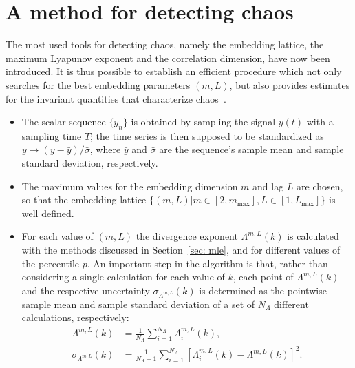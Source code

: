 \section{A method for detecting chaos}\label{sec: method for chaos}

The most used tools for detecting chaos, namely the embedding lattice, the maximum Lyapunov exponent
and the correlation dimension, have now been introduced.
It is thus possible to establish an efficient procedure which not only searches for the best
embedding parameters $(m,L)$, but also provides estimates for the invariant quantities that
characterize chaos~\cite{ref:perinelli2020chasing}.

\begin{itemize}

\item
The scalar sequence $\{y_n\}$ is obtained by sampling the signal $y(t)$ with a sampling time $T$;
the time series is then supposed to be standardized as
$y \rightarrow (y - \bar{y})/\bar{\sigma}$, where $\bar{y}$ and $\bar{\sigma}$ are the sequence's
sample mean and sample standard deviation, respectively.


\item
The maximum values for the embedding dimension $m$ and lag $L$ are chosen, so that the embedding
lattice $\{(m,L)|m\in[2,m_{\max}],L\in[1,L_{\max}]\}$ is well defined.


\item
For each value of $(m,L)$ the divergence exponent $\Lambda^{m,L}(k)$ is calculated with the methods
discussed in Section~\ref{sec: mle}, and for different values of the percentile $p$.
An important step in the algorithm is that, rather than
considering a single calculation for each value of $k$, each point of $\Lambda^{m,L}(k)$
and the respective uncertainty $\sigma_{\Lambda^{m,L}}(k)$ is determined
as the pointwise sample mean and sample standard
deviation of a set of $N_\Lambda$ different calculations, respectively:
\begin{equation}
\begin{aligned}
    \label{eq: sample mean divergence exponent}
    \Lambda^{m,L}(k)&=\frac{1}{N_\Lambda}\sum_{i=1}^{N_\Lambda}\Lambda_i^{m,L}(k),\\
    \sigma_{\Lambda^{m,L}}(k) &= \frac{1}{N_\Lambda-1}\sum_{i=1}^{N_\Lambda}{\left[
        \Lambda_i^{m,L}(k)-\Lambda^{m,L}(k)
    \right]}^2.
\end{aligned}
\end{equation}



\end{itemize}
